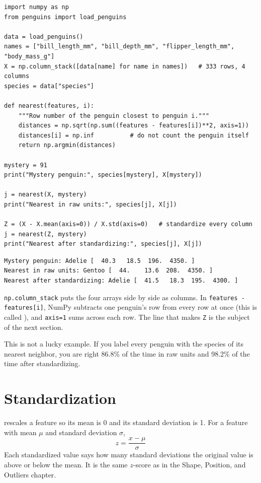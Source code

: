 \begin{verbatim}
import numpy as np
from penguins import load_penguins

data = load_penguins()
names = ["bill_length_mm", "bill_depth_mm", "flipper_length_mm", "body_mass_g"]
X = np.column_stack([data[name] for name in names])   # 333 rows, 4 columns
species = data["species"]

def nearest(features, i):
    """Row number of the penguin closest to penguin i."""
    distances = np.sqrt(np.sum((features - features[i])**2, axis=1))
    distances[i] = np.inf          # do not count the penguin itself
    return np.argmin(distances)

mystery = 91
print("Mystery penguin:", species[mystery], X[mystery])

j = nearest(X, mystery)
print("Nearest in raw units:", species[j], X[j])

Z = (X - X.mean(axis=0)) / X.std(axis=0)   # standardize every column
j = nearest(Z, mystery)
print("Nearest after standardizing:", species[j], X[j])
\end{verbatim}

\begin{verbatim}
Mystery penguin: Adelie [  40.3   18.5  196.  4350. ]
Nearest in raw units: Gentoo [  44.    13.6  208.  4350. ]
Nearest after standardizing: Adelie [  41.5   18.3  195.  4300. ]
\end{verbatim}

\verb|np.column_stack| puts the four arrays side by side as columns. In \verb|features - features[i]|, NumPy
subtracts one penguin's row from every row at once (this is called ),
and \verb|axis=1| sums across each row. The line that makes \verb|Z| is the subject of the next section.

This is not a lucky example. If you label every penguin with the species of its nearest neighbor, you are right
86.8\% of the time in raw units and 98.2\% of the time after standardizing.

\section{Standardization}
 rescales a feature so its mean is 0 and its standard deviation is 1. For a feature
with mean $\mu$ and standard deviation $\sigma$,
$$z = \frac{x - \mu}{\sigma}$$
Each standardized value says how many standard deviations the original value is above or below the mean. It is
the same $z$-score as in the Shape, Position, and Outliers chapter.

